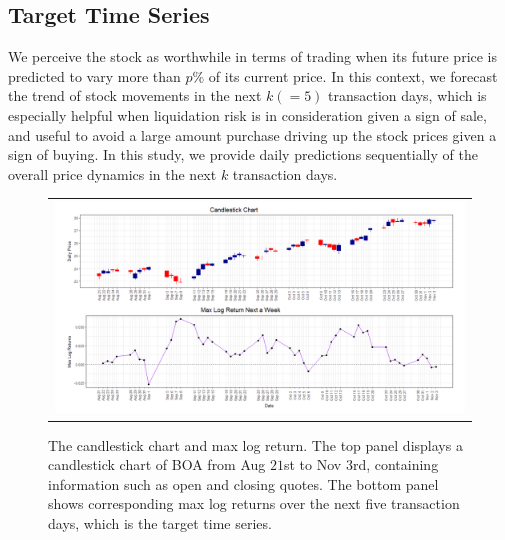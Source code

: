 \documentclass[twoside,11pt]{article}
\begin{document}
\subsection{Target Time Series}
We perceive the stock as worthwhile in terms of trading when its future price is predicted to vary more than $p\%$ of its current price. In this context, we forecast the trend of stock movements in the next $k(=5)$ transaction days, which is especially helpful when liquidation risk is in consideration given a sign of sale, and useful to avoid a large amount purchase driving up the stock prices given a sign of buying.  In this study, we provide daily predictions sequentially of the overall price dynamics in the next $k$ transaction days.


\begin{figure}[h]
	\centering
	\begin{tabular}{c}
		\includegraphics[width=1\linewidth]{boacand.png}
	\end{tabular}
	\caption{The candlestick chart and max log return. The top panel displays a candlestick chart of BOA from Aug $21$st to Nov $3$rd, containing information such as open and closing quotes. The bottom panel shows corresponding max log returns over the next five transaction days, which is the target time series.}
	\label{fig:candle_stick}
\end{figure}
\end{document}
